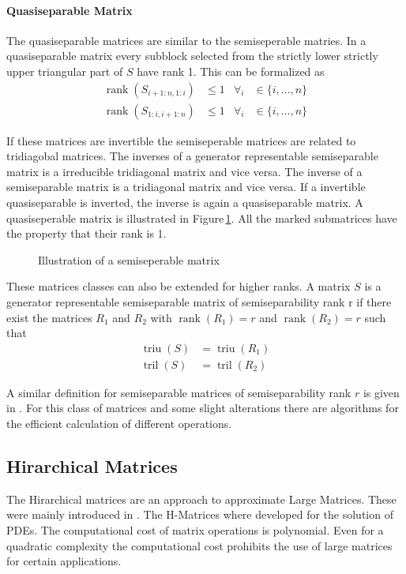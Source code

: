 \documentclass[doctype=mastersthesis,BCOR=15mm,biblatex]{ldvbook}%
\DeclareMathOperator{\rank}{rank}
\DeclareMathOperator{\triu}{triu}
\DeclareMathOperator{\tril}{tril}
\begin{document}
\paragraph{Quasiseparable Matrix}
The quasiseparable matrices are similar to the semiseperable matries. In a quasiseparable matrix every subblock selected from the strictly lower strictly upper triangular part of $S$ have rank 1. 
This can be formalized as 
\begin{align}
\rank(S_{i+1:n,1:i}) &\leq 1 & \forall_i &\in\{i,\dots,n\}\\
\rank(S_{1:i,i+1:n}) &\leq 1 & \forall_i &\in\{i,\dots,n\}
\end{align}


If these matrices are invertible the semiseperable matrices are related to tridiagobal matrices.
The inverses of a generator representable semiseparable matrix is a irreducible tridiagonal matrix and vice versa. 
The inverse of a semiseparable matrix is a tridiagonal matrix and vice versa.
If a invertible quasiseparable is inverted, the inverse is again a quasiseparable matrix.
A quasiseperable matrix is illustrated in Figure\,\ref{fig:quasiseperable}. All the marked submatrices have the property that their rank is 1.
\begin{figure}
	\centering
	
	\caption{Illustration of a semiseperable matrix}
	\label{fig:quasiseperable}
\end{figure}

These matrices classes can also be extended for higher ranks.
A matrix $S$ is a generator representable semiseparable matrix of semiseparability rank r if there exist the matrices $R_1$ and $R_2$ with $\rank(R_1)=r$ and $\rank(R_2)=r$ such that
\begin{align}
\triu(S) &= \triu(R_1)\\
\tril(S) &= \tril(R_2)
\end{align}

A similar definition for semiseparable matrices of semiseparability rank $r$ is given in \cite{vandebril_bibliography_2005}.
For this class of matrices and some slight alterations there are algorithms for the efficient calculation of different operations.

\subsection{Hirarchical Matrices}\label{subsec:H-mat}
The Hirarchical matrices are an approach to approximate Large Matrices. These were mainly introduced in \cite{grasedyck_theorie_2001,hackbusch_hierarchische_2009}.
The H-Matrices where developed for the solution of PDEs.
The computational cost of matrix operations is polynomial. Even for a quadratic complexity the computational cost prohibits the use of large matrices for certain applications.
\end{document}
